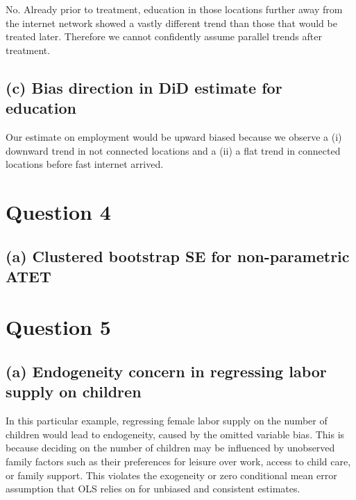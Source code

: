 \documentclass{scrartcl}
\begin{document}

No. Already prior to treatment, education in those locations further away from the internet network showed a vastly different trend than those that would be treated later. Therefore we cannot confidently assume parallel trends after treatment. 

\subsection*{(c) Bias direction in DiD estimate for education}


Our estimate on employment would be upward biased because we observe a (i) downward trend in not connected locations and a (ii) a flat trend in connected locations before fast internet arrived.

\section*{Question 4}

\subsection*{(a) Clustered bootstrap SE for non-parametric ATET}




\section*{Question 5}

\subsection*{(a) Endogeneity concern in regressing labor supply on children}


In this particular example, regressing female labor supply on the number of children would lead to endogeneity, caused by the omitted variable bias. This is because deciding on the number of children may be influenced by unobserved family factors such as their preferences for leisure over work, access to child care, or family support. This violates the exogeneity or zero conditional mean error assumption that OLS relies on for unbiased and consistent estimates.
\end{document}
